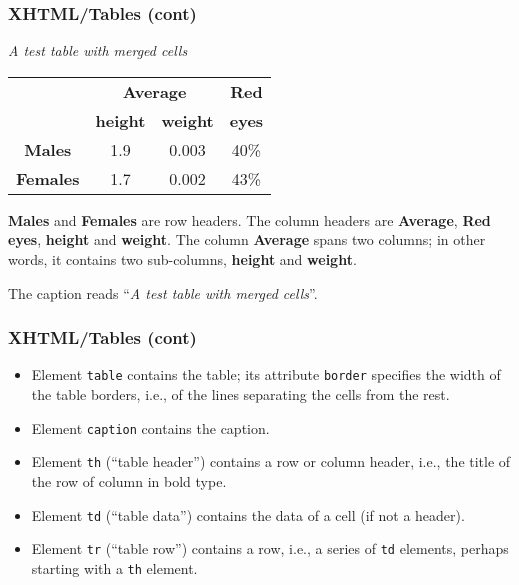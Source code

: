 %
\begin{frame}
\frametitle{XHTML/Tables (cont)}

\begin{center}
\emph{A test table with merged cells}\\

\begin{tabular}{|c|c|c|c|}
\hline
                 & \multicolumn{2}{|c|}{\textbf{Average}} & \textbf{Red}\\
\cline{2-3}
                 & \textbf{height}    &   \textbf{weight} & \textbf{eyes}\\
\hline
\textbf{Males}   & 1.9                & 0.003             & 40\%\\
\hline
\textbf{Females} & 1.7                & 0.002             & 43\%\\
\hline
\end{tabular}
\end{center}
\textbf{Males} and \textbf{Females} are row headers. The column headers
are \textbf{Average}, \textbf{Red eyes}, \textbf{height} and
\textbf{weight}. The column \textbf{Average} spans two columns; in
other words, it contains two sub-columns, \textbf{height} and
\textbf{weight}. 

The caption reads ``\emph{A test table with merged cells}''.

\end{frame}

%
\begin{frame}
\frametitle{XHTML/Tables (cont)}

\begin{itemize}

  \item Element \texttt{table} contains the table; its attribute
    \texttt{border} specifies the width of the table borders, i.e., of
    the lines separating the cells from the rest.

  \item Element \texttt{caption} contains the caption.

  \item Element \texttt{th} (``table header'') contains a row or
    column header, i.e., the title of the row of column in bold type.

  \item Element \texttt{td} (``table data'') contains the data of a
    cell (if not a header).

  \item Element \texttt{tr} (``table row'') contains a row, i.e., a
    series of \texttt{td} elements, perhaps starting with a
    \texttt{th} element.

\end{itemize}

\end{frame}


